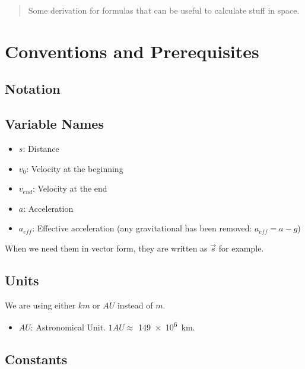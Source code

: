 \documentclass[10pt]{article}
\numberwithin{equation}{section}
\begin{document}
	\maketitle
	\newpage
	
	\tableofcontents
	\newpage
	
	\begin{abstract}
		Some derivation for formulas that can be useful to calculate stuff in space.
	\end{abstract}
	
	\section{Conventions and Prerequisites}
	
	\subsection{Notation}
	
	\subsection{Variable Names}
	
	\begin{itemize}
		\item $s$: Distance
		\item $v_0$: Velocity at the beginning
		\item $v_{end}$: Velocity at the end
		\item $a$: Acceleration
		\item $a_{eff}$: Effective acceleration (any gravitational has been removed: $a_{eff} = a - g$)
	\end{itemize}
	
	When we need them in vector form, they are written as $\vec{s}$ for example.
	
	\subsection{Units}
	
	We are using either $km$ or $AU$ instead of $m$.
	
	\begin{itemize}
		\item $AU$: Astronomical Unit. $1 AU \approx$ \SI{149e+6}{\km}.
	\end{itemize}
	
	\subsection{Constants}
	
\end{document}
